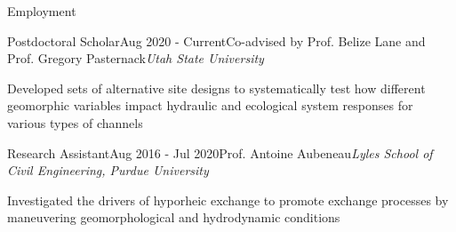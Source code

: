 \documentclass{resume_anzy} %
\begin{document}
\begin{rSection}{Employment}

\begin{rSubsection}{Postdoctoral Scholar}{Aug 2020 - Current}{Co-advised by Prof. Belize Lane and Prof. Gregory Pasternack}{\textit{Utah State University}}
\vspace{-1mm}
\item Developed sets
of alternative site designs to systematically test how different geomorphic variables impact hydraulic
and ecological system responses for various types of channels
\end{rSubsection}



\begin{rSubsection}{Research Assistant}{Aug 2016 - Jul 2020}{Prof. Antoine Aubeneau}{\textit{Lyles School of Civil Engineering, Purdue University}}
\vspace{-1mm}
\item Investigated the drivers of hyporheic exchange to promote exchange processes by maneuvering geomorphological and hydrodynamic conditions
\end{rSubsection}





\end{rSection}
\end{document}
